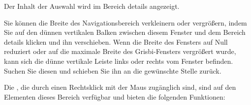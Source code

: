 Der Inhalt der Auswahl wird im Bereich details angezeigt.%


Sie können die Breite des Navigationsbereich verkleinern oder vergrößern, indem Sie auf den dünnen vertikalen Balken zwischen diesem Fenster und dem Bereich details klicken und ihn verschieben. Wenn die Breite des Fensters auf Null reduziert oder auf die maximale Breite des Grisbi-Fensters vergrößert wurde, kann sich die dünne vertikale Leiste links oder rechts vom Fenster befinden.  Suchen Sie diesen und schieben Sie ihn an die gewünschte Stelle zurück.%


Die , die durch einen Rechtsklick mit der Maus zugänglich sind, sind auf den Elementen dieses Bereich verfügbar und bieten die folgenden Funktionen:%

